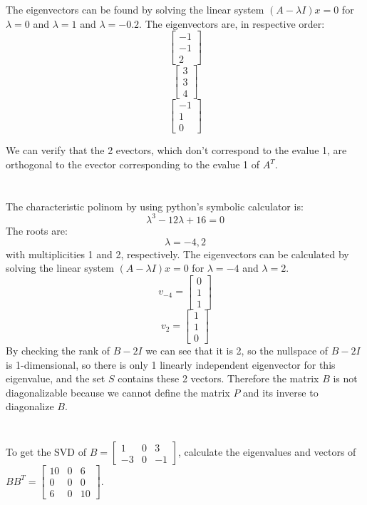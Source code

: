 \documentclass{article}
\begin{document}
\begin{enumerate}[label=\alph*)]
          The eigenvectors can be found by solving the linear system $(A - \lambda I) x = 0$ for $\lambda = 0$ and $\lambda = 1$ and $\lambda = -0.2$.
          The eigenvectors are, in respective order:
          \[ \left[\begin{matrix}-1\\-1\\2\end{matrix}\right] \]
          \[ \left[\begin{matrix}3\\3\\4\end{matrix}\right] \]
          \[ \left[\begin{matrix}-1\\1\\0\end{matrix}\right] \]

          We can verify that the 2 evectors, which don't correspond to the evalue 1,
          are orthogonal to the evector corresponding to the evalue 1 of $A^T$.
\end{enumerate}
\section{}
The characteristic polinom by using python's symbolic calculator is:
\[\lambda^{3} - 12 \lambda + 16 = 0\]
The roots are:
\[\lambda = -4, 2\]
with multiplicities 1 and 2, respectively.
The eigenvectors can be calculated by solving the linear system $(A - \lambda I) x = 0$ for $\lambda = -4$ and $\lambda = 2$.
\[v_{-4} = \begin{bmatrix} 0 \\ 1 \\ 1 \end{bmatrix}\]
\[v_{2} = \begin{bmatrix} 1 \\ 1 \\ 0 \end{bmatrix}\]
By checking the rank of $B-2I$ we can see that it is 2, so the nullspace of $B-2I$ is 1-dimensional,
so there is only 1 linearly independent eigenvector for this eigenvalue,
and the set $S$ contains these 2 vectors.
Therefore the matrix $B$ is not diagonalizable because we cannot define the matrix $P$ and its inverse to diagonalize $B$.

\section{}
To get the SVD of $\displaystyle B= \left[\begin{matrix}1 & 0 & 3\\-3 & 0 & -1\end{matrix}\right]$, calculate the eigenvalues and vectors of
$\displaystyle BB^T = \left[\begin{matrix}10 & 0 & 6\\0 & 0 & 0\\6 & 0 & 10\end{matrix}\right]$.
\end{document}
